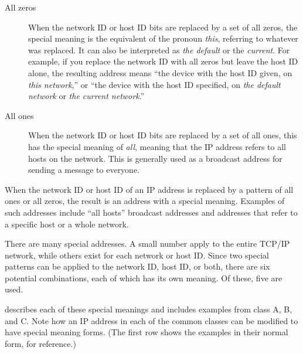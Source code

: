 \begin{description}
   \item[All zeros]
      When the network ID or host ID bits are replaced by a set of all zeros, the special meaning is the equivalent of the pronoun \emph{this}, referring to whatever was replaced.
      It can also be interpreted as \emph{the default} or the \emph{current}.
      For example, if you replace the network ID with all zeros but leave the host ID alone, the resulting address means ``the device with the host ID given, on \emph{this network},'' or ``the device with the host ID specified, on \emph{the default network} or \emph{the current network}.''
   \item[All ones]
      When the network ID or host ID bits are replaced by a set of all ones, this has the special meaning of \emph{all}, meaning that the IP address refers to all hosts on the network.
      This is generally used as a broadcast address for sending a message to everyone.
\end{description}


\begin{keyconcept}
When the network ID or host ID of an IP address is replaced by a pattern of all ones or all zeros, the result is an address with a special meaning.
Examples of such addresses include ``all hosts'' broadcast addresses and addresses that refer to a specific host or a whole network.
\end{keyconcept}

There are many special addresses.
A small number apply to the entire TCP/IP network, while others exist for each network or host ID. Since
two special patterns can be applied to the network ID, host ID, or both,
there are six potential combinations, each of which has its own meaning.
Of these, five are used.

 describes each of these special meanings and includes examples from class A, B, and C.
Note how an IP address in each of the common classes can be modified to have special meaning forms.
(The first row shows the examples in their normal form, for reference.)

